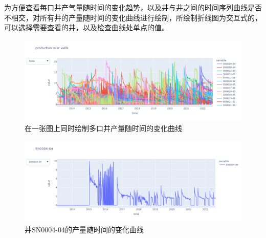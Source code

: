 为方便查看每口井产气量随时间的变化趋势，以及井与井之间的时间序列曲线是否不相交，对所有井的产量随时间的变化曲线进行绘制，所绘制折线图为交互式的，可以选择需要查看的井，以及检查曲线处单点的值。
\begin{figure}
    \centering
    \includegraphics[scale=0.3,angle=0]{figure/productiongraph.png}
    \caption{在一张图上同时绘制多口井产量随时间的变化曲线}
    \label{fig:productionchange}
\end{figure}
\begin{figure}
    \centering
    \includegraphics[scale=0.3,angle=0]{figure/awellgraph.png}
    \caption{井SN0004-04的产量随时间的变化曲线}
\end{figure}
